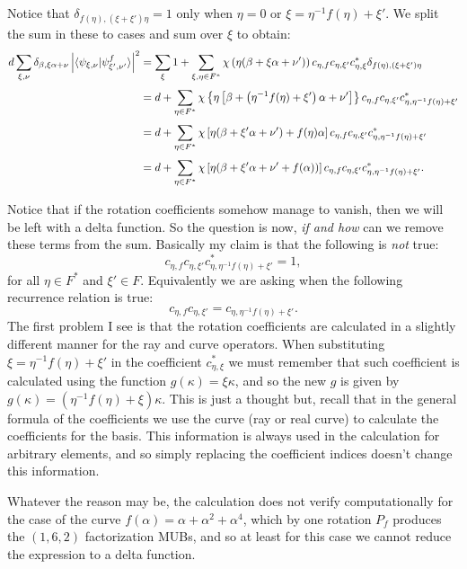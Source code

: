 \documentclass[a4paper]{article}
\begin{document}
  Notice that $\delta_{f(\eta), (\xi+\xi')\eta} = 1$ only
  when $\eta = 0$ or $\xi = \eta^{-1}f(\eta) + \xi'$. We
  split the sum in these to cases and sum over $\xi$ to
  obtain:
  \begin{align}
    d \sum_{\xi,\nu}^{} 
    \delta_{\beta,\xi\alpha+\nu}
    \left|
    \braket{\psi_{\xi,\nu}|\psi_{\xi',\nu'}^f}
    \right|^2
    &= \sum_{\xi}^{} 1
    + \sum_{\xi, \eta \in F^*}^{} 
    \chi\left( \eta(\beta + \xi\alpha+\nu') \right) 
    c_{\eta,f}c_{\eta,\xi'}c_{\eta,\xi}^* 
    \delta_{f(\eta), (\xi+\xi')\eta} \\
    &= d + \sum_{\eta \in F^*}^{} 
    \chi\left\{
      \eta\left[
        \beta + \left( \eta^{-1}f(\eta) + \xi' \right)
        \alpha + \nu'
      \right]
    \right\}
    c_{\eta,f} c_{\eta,\xi'}
    c_{\eta,\eta^{-1}f(\eta) + \xi'}^* \\
    &= d + \sum_{\eta \in F^*}^{} 
    \chi\left[
      \eta(\beta + \xi'\alpha + \nu') + f(\eta)\alpha
    \right] 
    c_{\eta,f} c_{\eta,\xi'}
    c_{\eta,\eta^{-1}f(\eta) + \xi'}^* \\
    &= d + \sum_{\eta \in F^*}^{} 
    \chi\left[
      \eta(\beta + \xi'\alpha + \nu' + f(\alpha))
    \right] 
    c_{\eta,f} c_{\eta,\xi'}
    c_{\eta,\eta^{-1}f(\eta) + \xi'}^*. 
  \end{align}

  Notice that if the rotation coefficients somehow manage to
  vanish, then we will be left with a delta function. So the
  question is now, \textit{if and how} can we remove these
  terms from the sum. Basically my claim is that the
  following is \textit{not} true:
  \begin{equation}
    c_{\eta,f} c_{\eta,\xi'}
    c_{\eta,\eta^{-1}f(\eta) + \xi'}^*
    = 1,
  \end{equation}
  for all $\eta \in F^*$ and $\xi' \in F$. Equivalently we
  are asking when the following recurrence relation is true:
  \begin{equation}
    c_{\eta,f} c_{\eta,\xi'}
    = 
    c_{\eta,\eta^{-1}f(\eta) + \xi'}.
  \end{equation}
  The first problem I see is that the rotation coefficients
  are calculated in a slightly different manner for the ray
  and curve operators. When substituting $\xi =
  \eta^{-1}f(\eta)+\xi'$ in the coefficient $c_{\eta,\xi}^*$ 
  we must remember that such coefficient is calculated using
  the function $g(\kappa) = \xi \kappa$, and so the new $g$
  is given by $g(\kappa) = \left( \eta^{-1}f(\eta)+\xi
  \right) \kappa$. This is just a thought but, recall that in
  the general formula of the coefficients we use the curve
  (ray or real curve) to calculate the coefficients for the
  basis. This information is always used in the calculation
  for arbitrary elements, and so simply replacing the
  coefficient indices doesn't change this information.
  
  Whatever the reason may be, the calculation does not
  verify computationally for the case of the curve
  $f(\alpha) = \alpha + \alpha^2 + \alpha^4$, which by one
  rotation $P_f$ produces the $(1,6,2)$ factorization MUBs,
  and so at least for this case we cannot reduce the
  expression to a delta function.
\end{document}
